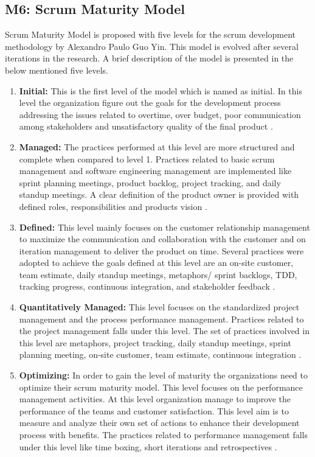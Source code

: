 \documentclass[a4paper,oneside]{bth}
\begin{document}
\subsection{M6: Scrum Maturity Model}
Scrum Maturity Model is proposed with five levels for the scrum development methodology by Alexandro Paulo Guo Yin. This model is evolved after several iterations in the research. A brief description of the model is presented in the below mentioned five levels.
\begin{enumerate}
\item \textbf{Initial:} This is the first level of the model which is named as initial. In this level the organization figure out the goals for the development process addressing the issues related to overtime, over budget, poor communication among stakeholders and unsatisfactory quality of the final product \cite{yin_scrum_2011}.
\item	\textbf{Managed:} The practices performed at this level are more structured and complete when compared to level 1. Practices related to basic scrum management and software engineering management are implemented like sprint planning meetings, product backlog, project tracking, and daily standup meetings. A clear definition of the product owner is provided with defined roles, responsibilities and products vision \cite{yin_scrum_2011}.
\item	\textbf{Defined:} This level mainly focuses on the customer relationship management to maximize the communication and collaboration with the customer and on iteration management to deliver the product on time. Several practices were adopted to achieve the goals defined at this level are an on-site customer, team estimate, daily standup meetings, metaphors/ sprint backlogs, TDD, tracking progress, continuous integration, and stakeholder feedback \cite{yin_scrum_2011}.
\item \textbf{	Quantitatively Managed:} This level focuses on the standardized project management and the process performance management. Practices related to the project management falls under this level. The set of practices involved in this level are metaphors, project tracking, daily standup meetings, sprint planning meeting, on-site customer, team estimate, continuous integration \cite{yin_scrum_2011}.
\item \textbf{Optimizing:} In order to gain the level of maturity the organizations need to optimize their scrum maturity model. This level focuses on the performance management activities. At this level organization manage to improve the performance of the teams and customer satisfaction. This level aim is to measure and analyze their own set of actions to enhance their development process with benefits. The practices related to performance management falls under this level like time boxing, short iterations and retrospectives \cite{yin_scrum_2011}.
\end{enumerate}
\end{document}
